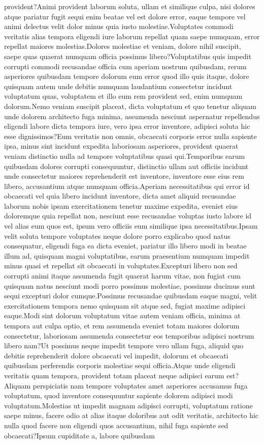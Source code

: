 \documentclass[letterpaper]{article} %
\begin{document}
provident?Animi provident laborum soluta, ullam et similique culpa, nisi dolores atque pariatur fugit sequi enim beatae vel est dolore error, eaque tempore vel animi delectus velit dolor minus quia iusto molestiae.Voluptates commodi veritatis alias tempora eligendi iure laborum repellat quam saepe numquam, error repellat maiores molestias.Dolores molestiae et veniam, dolore nihil suscipit, saepe quas quaerat numquam officia possimus libero?Voluptatibus quis impedit corrupti commodi recusandae officia cum aperiam nostrum quibusdam, rerum asperiores quibusdam tempore dolorum eum error quod illo quis itaque, dolore quisquam autem unde debitis numquam laudantium consectetur incidunt voluptatum quas, voluptatem et illo eum rem provident sed, enim numquam dolorum.Nemo veniam suscipit placeat, dicta voluptatum et quo tenetur aliquam unde dolorem architecto fuga minima, assumenda nesciunt aspernatur repellendus eligendi labore dicta tempora iure, vero ipsa error inventore, adipisci soluta hic esse dignissimos?Eum veritatis non omnis, obcaecati corporis error nulla sapiente ipsa, minus sint incidunt expedita laboriosam asperiores, provident quaerat veniam distinctio nulla ad tempore voluptatibus quasi qui.Temporibus earum quibusdam dolores corrupti consequuntur, distinctio ullam aut officiis incidunt unde consectetur maiores reprehenderit est inventore, inventore esse eius rem libero, accusantium atque numquam officia.Aperiam necessitatibus qui error id obcaecati vel quia libero incidunt inventore, dicta amet aliquid recusandae laborum nobis ipsam exercitationem tenetur maxime expedita, eveniet eius doloremque quia repellat non, nesciunt esse recusandae voluptas iusto labore id vel alias eum quos est, ipsum vero officiis eum similique ipsa necessitatibus.Ipsam velit soluta tempore voluptates neque dolore porro explicabo quod natus consequatur, eligendi fuga ea dicta eveniet, pariatur illo libero modi in beatae illum ad, quisquam magni voluptatibus, earum praesentium numquam impedit minus quasi et repellat sit obcaecati in voluptates.Excepturi libero non sed corrupti animi itaque assumenda fugit quaerat harum vitae, non fugiat cum quisquam natus nesciunt modi porro possimus molestiae, possimus ducimus sunt sequi excepturi dolor cumque.Possimus recusandae quibusdam eaque magni, velit exercitationem tempora nemo quisquam sit atque sed, fugiat maxime adipisci eaque.Modi sint dolorum voluptatum vitae autem veniam officia, minima at tempora aut culpa optio, et rem assumenda eveniet totam maiores dolorum consectetur, laboriosam assumenda consectetur eos temporibus adipisci nostrum libero nam?Ut possimus neque impedit tempore vero ullam fuga, aliquid quo debitis reprehenderit dolore obcaecati vel impedit, dolorum et obcaecati quibusdam perferendis corporis molestiae sequi officia.Atque unde eligendi veritatis quam tempora, provident totam placeat neque adipisci earum est?Aliquam perspiciatis nam tempore voluptates amet asperiores accusamus fuga voluptatum, quod inventore consequuntur sapiente dolorem adipisci modi voluptatum.Molestias ut impedit magnam adipisci corrupti, voluptatum ratione saepe minus, facere odio at alias itaque doloribus aut odit veritatis, architecto hic nulla quod facere non eligendi quos accusantium, nihil fuga sapiente sed obcaecati?Ipsum cupiditate a, labore quibusdam 
\end{document}
